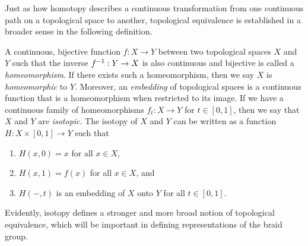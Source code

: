 Just as how homotopy describes a continuous transformation from one continuous path on a topological space to another, topological equivalence is established in a broader sense in the following definition.
\begin{definition}
    A continuous, bijective function $f:X\to Y$ between two topological spaces $X$ and $Y$ such that the inverse ${ f }^{-1}:Y\to X$ is also continuous and bijective is called a \textit{homeomorphism}. If there exists such a homeomorphism, then we say $X$ is \textit{homeomorphic} to $Y$. Moreover, an \textit{embedding} of topological spaces is a continuous function that is a homeomorphism when restricted to its image. If we have a continuous family of homeomorphisms $f_t:X\to Y$ for $t\in[0,1]$, then we say that $X$ and $Y$ are \textit{isotopic}. The isotopy of $X$ and $Y$ can be written as a function $H:X\times[0,1]\to Y$ such that
    \begin{enumerate}
        \item $H(x,0)=x$ for all $x\in X$, 
        \item $H(x,1)=f(x)$ for all $x\in X$, and
        \item $H(-,t)$ is an embedding of $X$ onto $Y$ for all $t\in[0,1]$.
    \end{enumerate}
\end{definition}
Evidently, isotopy defines a stronger and more broad notion of topological equivalence, which will be important in defining representations of the braid group.